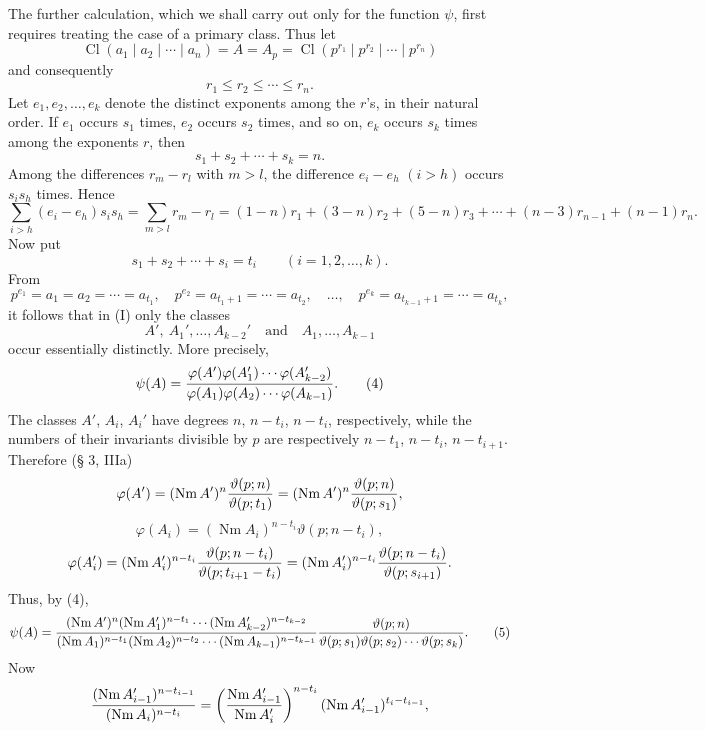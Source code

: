 \documentclass[11pt,a4paper]{article}
\newcommand{\Cl}{\operatorname{Cl}}
\newcommand{\Nm}{\operatorname{Nm}}
\newcommand{\tht}{\vartheta}
\begin{document}
The further calculation, which we shall carry out only for the function $\psi$, first requires treating the case of a primary class. Thus let
\[
 \Cl(a_1\mid a_2\mid\cdots\mid a_n)=A=A_p=
 \Cl(p^{r_1}\mid p^{r_2}\mid\cdots\mid p^{r_n})
\]
and consequently
\[
 r_1\le r_2\le\cdots\le r_n.
\]
Let $e_1,e_2,\ldots,e_k$ denote the distinct exponents among the $r$'s, in their natural order. If $e_1$ occurs $s_1$ times, $e_2$ occurs $s_2$ times, and so on, $e_k$ occurs $s_k$ times among the exponents $r$, then
\begin{equation}
 s_1+s_2+\cdots+s_k=n.
\tag{1}
\end{equation}
Among the differences $r_m-r_l$ with $m>l$, the difference $e_i-e_h$ $(i>h)$ occurs $s_i s_h$ times. Hence
\begin{equation}
 \sum_{i>h}(e_i-e_h)s_i s_h=\sum_{m>l}r_m-r_l
 =(1-n)r_1+(3-n)r_2+(5-n)r_3+\cdots+(n-3)r_{n-1}+(n-1)r_n.
\tag{2}
\end{equation}
Now put
\[
 s_1+s_2+\cdots+s_i=t_i\qquad (i=1,2,\ldots,k).
\]
From
\begin{equation}
 p^{e_1}=a_1=a_2=\cdots=a_{t_1},\quad
 p^{e_2}=a_{t_1+1}=\cdots=a_{t_2},\quad\ldots,\quad
 p^{e_k}=a_{t_{k-1}+1}=\cdots=a_{t_k},
\tag{3}
\end{equation}
it follows that in (I) only the classes
\[
 A',\ A_1',\ldots,A_{k-2}'
\quad\text{and}\quad
 A_1,\ldots,A_{k-1}
\]
occur essentially distinctly. More precisely,
\begin{equation}
 \psi(A)=
 {\varphi(A')\varphi(A_1')\cdots\varphi(A_{k-2}')
 \over
 \varphi(A_1)\varphi(A_2)\cdots\varphi(A_{k-1})}.
\tag{4}
\end{equation}
The classes $A'$, $A_i$, $A_i'$ have degrees $n$, $n-t_i$, $n-t_i$, respectively, while the numbers of their invariants divisible by $p$ are respectively $n-t_1$, $n-t_i$, $n-t_{i+1}$. Therefore (§ 3, IIIa)
\[
 \varphi(A')=(\Nm A')^n {\tht(p;n)\over\tht(p;t_1)}=(\Nm A')^n {\tht(p;n)\over\tht(p;s_1)},
\]
\[
 \varphi(A_i)=(\Nm A_i)^{n-t_i}\tht(p;n-t_i),
\]
\[
 \varphi(A_i')=(\Nm A_i')^{n-t_i}
 {\tht(p;n-t_i)\over\tht(p;t_{i+1}-t_i)}
 = (\Nm A_i')^{n-t_i}{\tht(p;n-t_i)\over\tht(p;s_{i+1})}.
\]
Thus, by (4),
\begin{equation}
 \psi(A)=
 { (\Nm A')^n(\Nm A_1')^{n-t_1}\cdots(\Nm A_{k-2}')^{n-t_{k-2}}
 \over
 (\Nm A_1)^{n-t_1}(\Nm A_2)^{n-t_2}\cdots(\Nm A_{k-1})^{n-t_{k-1}} }
 {\tht(p;n)\over\tht(p;s_1)\tht(p;s_2)\cdots\tht(p;s_k)}.
\tag{5}
\end{equation}
Now
\[
 { (\Nm A_{i-1}')^{n-t_{i-1}}
 \over (\Nm A_i)^{n-t_i} }
 =\left({\Nm A_{i-1}'\over\Nm A_i'}\right)^{n-t_i}(\Nm A_{i-1}')^{t_i-t_{i-1}},
\]
\end{document}
